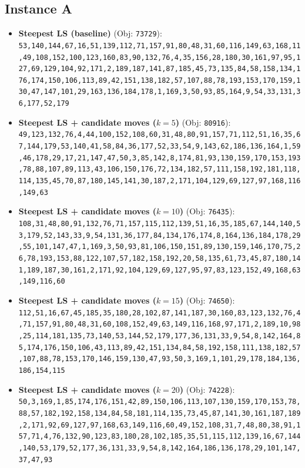 \subsection{Instance A}
\begin{itemize}[leftmargin=1.5em]
    \item \textbf{Steepest LS (baseline)} (Obj: \texttt{73729}):\\
    \texttt{53,140,144,67,16,51,139,112,71,157,91,80,48,31,60,116,149,63,168,11,49,108,152,100,123,160,83,90,132,76,4,35,156,28,180,30,161,97,95,127,69,129,104,92,171,2,189,187,141,87,185,45,73,135,84,58,158,134,176,174,150,106,113,89,42,151,138,182,57,107,88,78,193,153,170,159,130,47,147,101,29,163,136,184,178,1,169,3,50,93,85,164,9,54,33,131,36,177,52,179}
    \item \textbf{Steepest LS + candidate moves ($k = 5$)} (Obj: \texttt{80916}):\\
    \texttt{49,123,132,76,4,44,100,152,108,60,31,48,80,91,157,71,112,51,16,35,67,144,179,53,140,41,58,84,36,177,52,33,54,9,143,62,186,136,164,1,59,46,178,29,17,21,147,47,50,3,85,142,8,174,81,93,130,159,170,153,193,78,88,107,89,113,43,106,150,176,72,134,182,57,111,158,192,181,118,114,135,45,70,87,180,145,141,30,187,2,171,104,129,69,127,97,168,116,149,63}
    \item \textbf{Steepest LS + candidate moves ($k = 10$)} (Obj: \texttt{76435}):\\
    \texttt{108,31,48,80,91,132,76,71,157,115,112,139,51,16,35,185,67,144,140,53,179,52,143,33,9,54,131,36,177,84,134,176,174,8,164,136,184,178,29,55,101,147,47,1,169,3,50,93,81,106,150,151,89,130,159,146,170,75,26,78,193,153,88,122,107,57,182,158,192,20,58,135,61,73,45,87,180,141,189,187,30,161,2,171,92,104,129,69,127,95,97,83,123,152,49,168,63,149,116,60}
    \item \textbf{Steepest LS + candidate moves ($k = 15$)} (Obj: \texttt{74650}):\\
    \texttt{112,51,16,67,45,185,35,180,28,102,87,141,187,30,160,83,123,132,76,4,71,157,91,80,48,31,60,108,152,49,63,149,116,168,97,171,2,189,10,98,25,114,181,135,73,140,53,144,52,179,177,36,131,33,9,54,8,142,164,85,174,176,150,106,43,113,89,42,151,134,84,58,192,158,111,138,182,57,107,88,78,153,170,146,159,130,47,93,50,3,169,1,101,29,178,184,136,186,154,115}
    \item \textbf{Steepest LS + candidate moves ($k = 20$)} (Obj: \texttt{74228}):\\
    \texttt{50,3,169,1,85,174,176,151,42,89,150,106,113,107,130,159,170,153,78,88,57,182,192,158,134,84,58,181,114,135,73,45,87,141,30,161,187,189,2,171,92,69,127,97,168,63,149,116,60,49,152,108,31,7,48,80,38,91,157,71,4,76,132,90,123,83,180,28,102,185,35,51,115,112,139,16,67,144,140,53,179,52,177,36,131,33,9,54,8,142,164,186,136,178,29,101,147,37,47,93}
\end{itemize}

